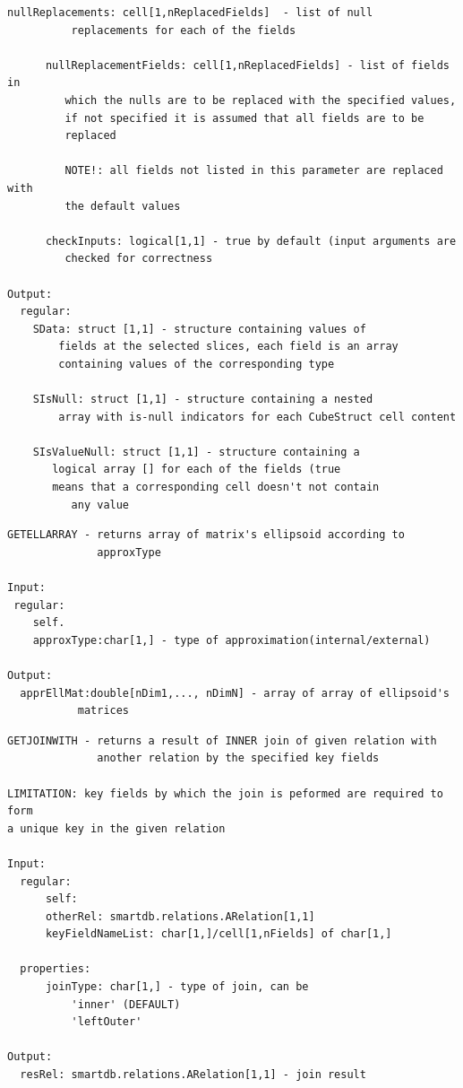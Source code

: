 \documentclass[letterpaper,10pt,english]{sphinxmanual}
\begin{document}
\begin{Verbatim}[commandchars=\\\{\}]
      nullReplacements: cell[1,nReplacedFields]  - list of null
          replacements for each of the fields

      nullReplacementFields: cell[1,nReplacedFields] - list of fields in
         which the nulls are to be replaced with the specified values,
         if not specified it is assumed that all fields are to be
         replaced

         NOTE!: all fields not listed in this parameter are replaced with
         the default values

      checkInputs: logical[1,1] - true by default (input arguments are
         checked for correctness

Output:
  regular:
    SData: struct [1,1] - structure containing values of
        fields at the selected slices, each field is an array
        containing values of the corresponding type

    SIsNull: struct [1,1] - structure containing a nested
        array with is-null indicators for each CubeStruct cell content

    SIsValueNull: struct [1,1] - structure containing a
       logical array [] for each of the fields (true
       means that a corresponding cell doesn't not contain
          any value
\end{Verbatim}

\begin{Verbatim}[commandchars=\\\{\}]
GETELLARRAY - returns array of matrix's ellipsoid according to
              approxType

Input:
 regular:
    self.
    approxType:char[1,] - type of approximation(internal/external)

Output:
  apprEllMat:double[nDim1,..., nDimN] - array of array of ellipsoid's
           matrices
\end{Verbatim}

\begin{Verbatim}[commandchars=\\\{\}]
GETJOINWITH - returns a result of INNER join of given relation with
              another relation by the specified key fields

LIMITATION: key fields by which the join is peformed are required to form
a unique key in the given relation

Input:
  regular:
      self:
      otherRel: smartdb.relations.ARelation[1,1]
      keyFieldNameList: char[1,]/cell[1,nFields] of char[1,]

  properties:
      joinType: char[1,] - type of join, can be
          'inner' (DEFAULT)
          'leftOuter'

Output:
  resRel: smartdb.relations.ARelation[1,1] - join result
\end{Verbatim}
\end{document}
